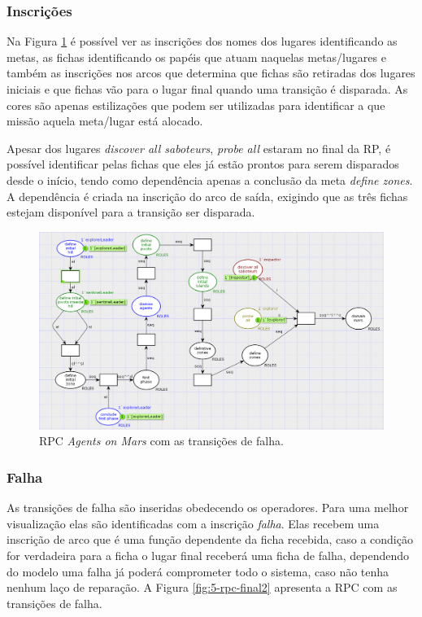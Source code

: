 \subsubsection{Inscrições}

Na Figura \ref{fig:5-rpc-incricao} é possível ver as inscrições dos nomes dos lugares identificando as metas, as fichas identificando os papéis que atuam naquelas metas/lugares e também as inscrições nos arcos que determina que fichas são retiradas dos lugares iniciais e que fichas vão para o lugar final quando uma transição é disparada. As cores são apenas estilizações que podem ser utilizadas para identificar a que missão aquela meta/lugar está alocado.

Apesar dos lugares \textit{discover all saboteurs}, \textit{probe all} estaram no final da RP, é possível identificar pelas fichas que eles já estão prontos para serem disparados desde o início, tendo como dependência apenas a conclusão da meta \textit{define zones}. A dependência é criada na inscrição do arco de saída, exigindo que as três fichas estejam disponível para a transição ser disparada.

\begin{figure}[ht]
\centering
\includegraphics[scale=0.55]{imagens/5-rpc-incricao.png}
\caption{RPC \textit{Agents on Mars} com as transições de falha.}
\label{fig:5-rpc-incricao}
\end{figure}

\subsubsection{Falha}

As transições de falha são inseridas obedecendo os operadores. Para uma melhor visualização elas são identificadas com a inscrição \textit{falha}. Elas recebem uma inscrição de arco que é uma função dependente da ficha recebida, caso a condição for verdadeira para a ficha o lugar final receberá uma ficha de falha, dependendo do modelo uma falha já poderá comprometer todo o sistema, caso não tenha nenhum laço de reparação. A Figura \ref{fig:5-rpc-final2} apresenta a RPC com as transições de falha.

